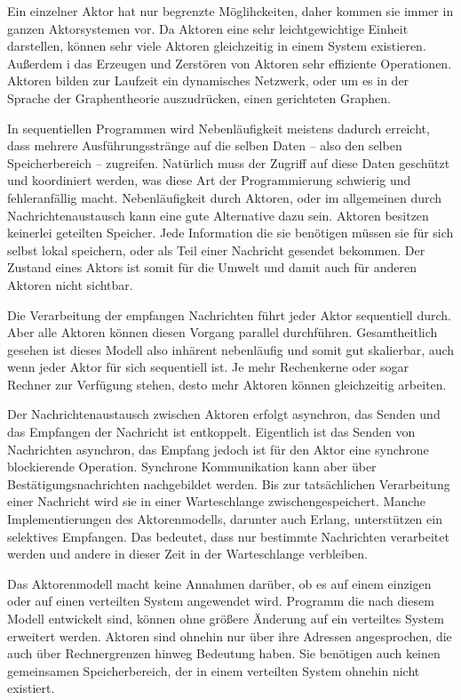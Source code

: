Ein einzelner Aktor hat nur begrenzte Möglihckeiten, daher kommen sie immer in ganzen Aktorsystemen vor. Da Aktoren eine sehr leichtgewichtige Einheit darstellen, können sehr viele Aktoren gleichzeitig in einem System existieren. Außerdem i das Erzeugen und Zerstören von Aktoren sehr effiziente Operationen. Aktoren bilden zur Laufzeit ein dynamisches Netzwerk, oder um es in der Sprache der Graphentheorie auszudrücken, einen gerichteten Graphen.

In sequentiellen Programmen wird Nebenläufigkeit meistens dadurch erreicht, dass mehrere Ausführungsstränge auf die selben Daten -- also den selben Speicherbereich -- zugreifen. Natürlich muss der Zugriff auf diese Daten geschützt und koordiniert werden, was diese Art der Programmierung schwierig und fehleranfällig macht. Nebenläufigkeit durch Aktoren, oder im allgemeinen durch Nachrichtenaustausch kann eine gute Alternative dazu sein. Aktoren besitzen keinerlei geteilten Speicher. Jede Information die sie benötigen müssen sie für sich selbst lokal speichern, oder als Teil einer Nachricht gesendet bekommen. Der Zustand eines Aktors ist somit für die Umwelt und damit auch für anderen Aktoren nicht sichtbar.

Die Verarbeitung der empfangen Nachrichten führt jeder Aktor sequentiell durch. Aber alle Aktoren können diesen Vorgang parallel durchführen. Gesamtheitlich gesehen ist dieses Modell also inhärent nebenläufig und somit gut skalierbar, auch wenn jeder Aktor für sich sequentiell ist. Je mehr Rechenkerne oder sogar Rechner zur Verfügung stehen, desto mehr Aktoren können gleichzeitig arbeiten.

Der Nachrichtenaustausch zwischen Aktoren erfolgt asynchron, \dh das Senden und das Empfangen der Nachricht ist entkoppelt. Eigentlich ist das Senden von Nachrichten asynchron, das Empfang jedoch ist für den Aktor eine synchrone \bzw blockierende Operation. Synchrone Kommunikation kann aber über Bestätigungsnachrichten nachgebildet werden. Bis zur tatsächlichen Verarbeitung einer Nachricht wird sie in einer Warteschlange zwischengespeichert. Manche Implementierungen des Aktorenmodells, darunter auch Erlang, unterstützen ein selektives Empfangen. Das bedeutet, dass nur bestimmte Nachrichten verarbeitet werden und andere in dieser Zeit in der Warteschlange verbleiben.

Das Aktorenmodell macht keine Annahmen darüber, ob es auf einem einzigen oder auf einen verteilten System angewendet wird. \Dah Programm die nach diesem Modell entwickelt sind, können ohne größere Änderung auf ein verteiltes System erweitert werden. Aktoren sind ohnehin nur über ihre Adressen angesprochen, die auch über Rechnergrenzen hinweg Bedeutung haben. Sie benötigen auch keinen gemeinsamen Speicherbereich, der in einem verteilten System ohnehin nicht existiert.

